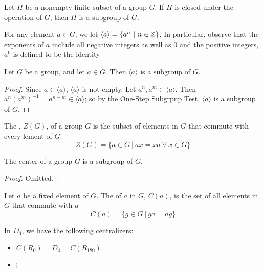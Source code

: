 \documentclass[12pt]{scrartcl}
\begin{document}
\begin{theorem}
  Let $H$ be a nonempty finite subset of a group $G$. If $H$ is closed under the operation of $G$, then $H$ is a subgroup of $G$. 
\end{theorem}

\begin{definition}
  For any element $a \in G$, we let $\langle a \rangle = \{a^n \ | \ n \in \mathbb Z\}$. In particular, observe
  that the exponents of $a$ include all negative integers as well as $0$ and the positive integers, 
  $a^0$ is defined to be the identity
\end{definition}

\begin{theorem}
  Let $G$ be a group, and let $a \in G$. Then $\langle a \rangle$ is a subgroup of $G$. 
  \begin{proof}
    Since $a \in \langle a \rangle$, $\langle a \rangle$ is not empty. Let $a^n, a^m \in \langle a \rangle$. Then 
    $a^n (a^m)^{-1} = a^{n-m} \in \langle a \rangle$; so by the One-Step Subgrpup Test, $\langle a \rangle$ is a subgroup of $G$. 
  \end{proof}
\end{theorem}

\begin{definition}
  The , $Z(G)$, of a group $G$ is the subset of elements in $G$ that commute with every lement of $G$. 
  \[Z(G) = \{a \in G \ | \ ax = xa \ \forall \ x \in G\}\]
\end{definition}

\begin{theorem}
  The center of a group $G$ is a subgroup of $G$. 
  \begin{proof}
    Omitted.
  \end{proof}
\end{theorem}

\begin{definition}[Centralizer of $a$ in $G$]
  Let $a$ be a fixed element of $G$. The  of $a$ in $G$, $C(a)$, is the set 
  of all elements in $G$ that commute with $a$
  \[C(a) = \{g \in G \ | \ ga = ag\}\]
\end{definition}

\begin{example}
  In $D_4$, we have the following centralizers: 
  \begin{itemize}
    \item $C(R_0) = D_4 = C(R_{180})$
    \item $\vdots$
  \end{itemize}
\end{example}
\end{document}
